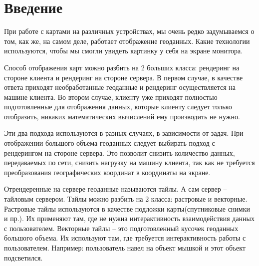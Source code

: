 \section*{\Large{Введение}}
При работе с картами на различных устройствах, мы очень редко задумываемся о том, как же, на самом деле,
работает отображение геоданных. Какие технологии используются, чтобы мы смогли увидеть картинку у себя на экране
монитора.

Способ отображения карт можно разбить на 2 больших класса: рендеринг на стороне клиента и рендеринг на стороне
сервера.
В первом случае, в качестве ответа приходят необработанные геоданные и рендеринг осуществляется на машине клиента.
Во втором случае, клиенту уже приходят полностью подготовленные для отображения данных,
которые клиенту следует только отобразить,
никаких математических вычислений ему производить не нужно.

Эти два подхода используются в разных случаях, в зависимости от задач.
При отображении большого объема геоданных следует выбирать подход с рендерингом
на стороне сервера. Это позволит снизить количество данных, передаваемых по сети, снизить нагрузку на
машину клиента, так как не требуется преобразования географических координат в координаты на экране.

Отрендеренные на сервере геоданные называются тайлы. А сам сервер -- тайловым сервером.
Тайлы можно разбить на 2 класса: растровые и векторные. Растровые тайлы используются в качестве
подложки карты(спутниковые снимки и пр.). Их применяют там, где не нужна интерактивность взаимодействия данных
с пользователем. Векторные тайлы -- это подготовленный кусочек геоданных большого объема. Их используют там, где
требуется интерактивность работы с пользователем. Например: пользователь навел на объект мышкой и этот объект подсветился.

